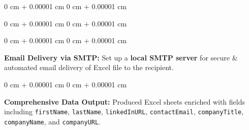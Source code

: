 \documentclass[10pt, letterpaper]{article}
\newenvironment{onecolentry}{
    \begin{adjustwidth}{
        0 cm + 0.00001 cm
    }{
        0 cm + 0.00001 cm
    }
}{
    \end{adjustwidth}
} %
\begin{document}
\begin{onecolentry}
\begin{onecolentry}
  \end{onecolentry}
  \begin{onecolentry}
    \textbf{Email Delivery via SMTP:} Set up a \textbf{local SMTP server} for secure \& automated email delivery of Excel file to the recipient.
  \end{onecolentry}
  \begin{onecolentry}
    \textbf{Comprehensive Data Output:} Produced Excel sheets enriched with fields including \texttt{firstName}, \texttt{lastName}, \texttt{linkedInURL}, \texttt{contactEmail}, \texttt{companyTitle}, \texttt{companyName}, and \texttt{companyURL}.
  \end{onecolentry}
\end{onecolentry}

\vspace{0.20 cm}
\end{document}
